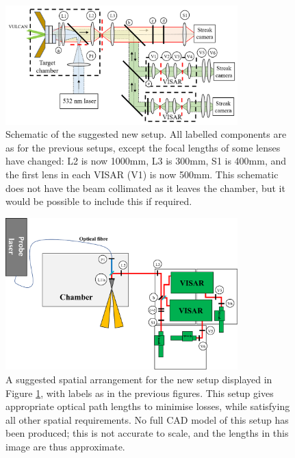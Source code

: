 \begin{figure}
\begin{centering}
\includegraphics[width=0.8\textwidth]{figures/Experiment/SchematicsWithBackgrounds/ImprovedSchematic.png}%
\caption{\label{fig:SuggestedSchematic} Schematic of the suggested new setup. All labelled components are as for the previous setups, except the focal lengths of some lenses have changed: L2 is now 1000mm, L3 is 300mm, S1 is 400mm, and the first lens in each VISAR (V1) is now 500mm. This schematic does not have the beam collimated as it leaves the chamber, but it would be possible to include this if required.}
\end{centering}
\end{figure}

\begin{figure}
\begin{centering}
\includegraphics[width=0.8\textwidth]{figures/Experiment/ImprovedSetup.pdf}%
\caption{\label{fig:SuggestedSetup} A suggested spatial arrangement for the new setup displayed in Figure \ref{fig:SuggestedSchematic}, with labels as in the previous figures. This setup gives appropriate optical path lengths to minimise losses, while satisfying all other spatial requirements. No full CAD model of this setup has been produced; this is not accurate to scale, and the lengths in this image are thus approximate.}
\end{centering}
\end{figure}

